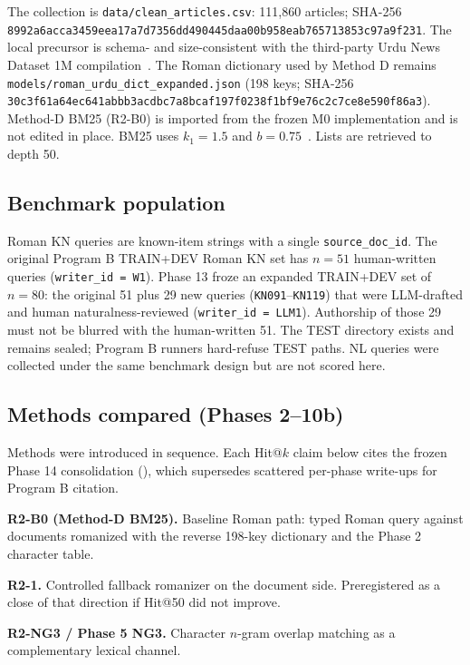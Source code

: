 \documentclass[10pt,letterpaper]{article}
\begin{document}
The collection is \texttt{data/clean\_articles.csv}: 111,860 articles; SHA-256 \texttt{8992a6acca3459eea17a7d7356dd490445daa00b958eab765713853c97a9f231}. The local precursor is schema- and size-consistent with the third-party Urdu News Dataset 1M compilation~\cite{bib16,bib17}. The Roman dictionary used by Method D remains \texttt{models/roman\_urdu\_dict\_expanded.json} (198 keys; SHA-256 \texttt{30c3f61a64ec641abbb3acdbc7a8bcaf197f0238f1bf9e76c2c7ce8e590f86a3}). Method-D BM25 (R2-B0) is imported from the frozen M0 implementation and is not edited in place. BM25 uses $k_1 = 1.5$ and $b = 0.75$~\cite{bib13}. Lists are retrieved to depth 50.

\subsection*{Benchmark population}

Roman KN queries are known-item strings with a single \texttt{source\_doc\_id}. The original Program B TRAIN+DEV Roman KN set has $n = 51$ human-written queries (\texttt{writer\_id = W1}). Phase 13 froze an expanded TRAIN+DEV set of $n = 80$: the original 51 plus 29 new queries (\texttt{KN091}--\texttt{KN119}) that were LLM-drafted and human naturalness-reviewed (\texttt{writer\_id = LLM1}). Authorship of those 29 must not be blurred with the human-written 51. The TEST directory exists and remains sealed; Program B runners hard-refuse TEST paths. NL queries were collected under the same benchmark design but are not scored here.

\subsection*{Methods compared (Phases 2--10b)}

Methods were introduced in sequence. Each Hit@$k$ claim below cites the frozen Phase 14 consolidation (), which supersedes scattered per-phase write-ups for Program B citation.

\textbf{R2-B0 (Method-D BM25).} Baseline Roman path: typed Roman query against documents romanized with the reverse 198-key dictionary and the Phase 2 character table.

\textbf{R2-1.} Controlled fallback romanizer on the document side. Preregistered as a close of that direction if Hit@50 did not improve.

\textbf{R2-NG3 / Phase 5 NG3.} Character $n$-gram overlap matching as a complementary lexical channel.
\end{document}
